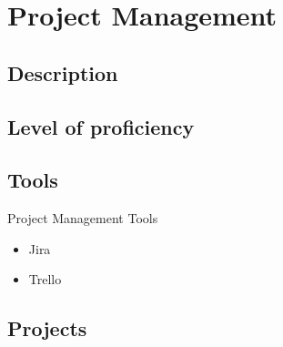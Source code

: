 \section{Project Management}

\subsection{Description}
\subsection{Level of proficiency}
\subsection{Tools}

\item Project Management Tools
\begin{itemize}
    \item Jira
    \item Trello
\end{itemize}

\subsection{Projects}

\newpage
